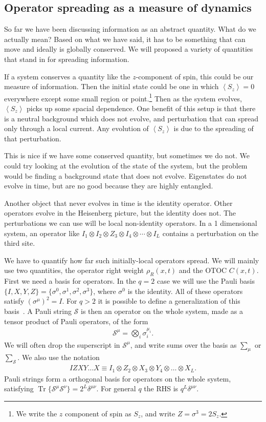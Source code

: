 \documentclass[a4paper,11pt]{article}
\newcommand{\ex}[1]{\left\langle #1 \right\rangle}
\renewcommand{\S}{\mathcal{S}}
\DeclareMathOperator{\Tr}{Tr}
\begin{document}
\subsection{Operator spreading as a measure of dynamics} \label{sub:opsp}

So far we have been discussing information as an abstract quantity. What do we actually mean? Based on what we have said, it has to be something that can move and ideally is globally conserved. We will proposed a variety of quantities that stand in for spreading information.

If a system conserves a quantity like the $z$-component of spin, this could be our measure of information. Then the initial state could be one in which $\ex{S_z} = 0$ everywhere except some small region or point.\footnote{We write the $z$ component of spin as $S_z$, and write $Z=\sigma^3=2S_z$.} Then as the system evolves, $\ex{S_z}$ picks up some spacial dependence. One benefit of this setup is that there is a neutral background which does not evolve, and perturbation that can spread only through a local current. Any evolution of $\ex{S_z}$ is due to the spreading of that perturbation.

This is nice if we have some conserved quantity, but sometimes we do not. We could try looking at the evolution of the state of the system, but the problem would be finding a background state that does not evolve. 
Eigenstates do not evolve in time, but are no good because they are highly entangled.

Another object that never evolves in time is the identity operator. Other operators evolve in the Heisenberg picture, but the identity does not. The perturbations we can use will be local non-identity operators. In a 1 dimensional system, an operator like $I_1\otimes I_2\otimes Z_3 \otimes I_4\otimes\cdots\otimes I_L$ contains a perturbation on the third site. 

We have to quantify how far such initially-local operators spread. We will mainly use two quantities, the operator right weight $\rho_R(x,t)$ and the OTOC $C(x,t)$. First we need a basis for operators. In the $q=2$ case we will use the Pauli basis $\{I, X, Y, Z\} = \{\sigma^0, \sigma^1, \sigma^2, \sigma^3\}$, where $\sigma^0$ is the identity. All of these operators satisfy $(\sigma^\mu)^2=I$. For $q>2$ it is possible to define a generalization of this basis~\cite{vonKeyserlingkHydro}. A Pauli string $\S$ is then an operator on the whole system, made as a tensor product of Pauli operators, of the form
\begin{align}
\S^\mu = \bigotimes_i\sigma_i^{\mu_i}.
\end{align}
We will often drop the superscript in $\S^\mu$, and write sums over the basis as $\sum_\mu$ or $\sum_\S$. We also use the notation 
\begin{align}
IZXY\dots X \equiv I_1\otimes Z_2\otimes X_3\otimes Y_4 \otimes\dots\otimes X_L.
\end{align}
Pauli strings form a orthogonal basis for operators on the whole system, satisfying $\Tr\{\S^\mu\S^\nu\} = 2^L\delta^{\mu\nu}$. For general $q$ the RHS is $q^L\delta^{\mu\nu}$. 
\end{document}
